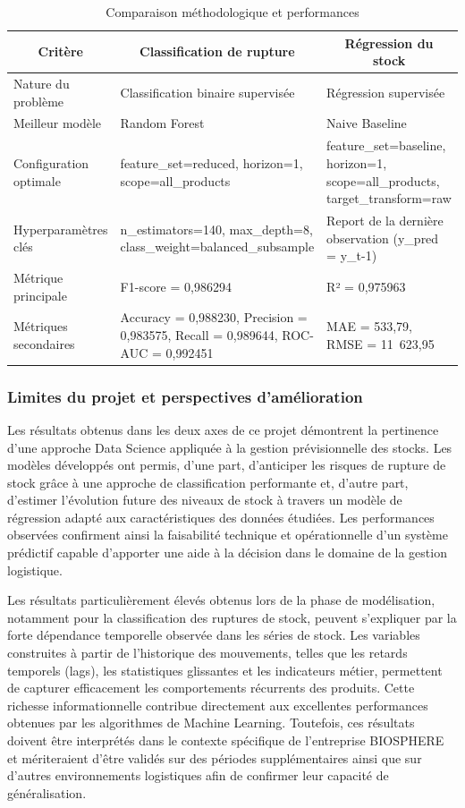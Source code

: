 \begin{table}[H]
\centering
\caption{Comparaison méthodologique et performances}
\label{tab:ch4:comparaison_axes}
\small
\begin{tabular}{|p{3.5cm}|p{5.5cm}|p{5.5cm}|}
\hline
\multicolumn{1}{|c|}{\textbf{Critère}} & \multicolumn{1}{c|}{\textbf{Classification de rupture}} & \multicolumn{1}{c|}{\textbf{Régression du stock}} \\
\hline
Nature du problème & Classification binaire supervisée & Régression supervisée \\
\hline
Meilleur modèle & Random Forest & Naive Baseline \\
\hline
Configuration optimale & feature\_set=reduced, horizon=1, scope=all\_products & feature\_set=baseline, horizon=1, scope=all\_products, target\_transform=raw \\
\hline
Hyperparamètres clés & n\_estimators=140, max\_depth=8, class\_weight=balanced\_subsample & Report de la dernière observation (y\_pred = y\_{t-1}) \\
\hline
Métrique principale & F1-score = 0,986294 & R² = 0,975963 \\
\hline
Métriques secondaires & Accuracy = 0,988230, Precision = 0,983575, Recall = 0,989644, ROC-AUC = 0,992451 & MAE = 533,79, RMSE = 11~623,95 \\
\hline
\end{tabular}
\end{table}
 
\subsubsection{Limites du projet et perspectives d'amélioration}
 
Les résultats obtenus dans les deux axes de ce projet démontrent la pertinence d'une approche Data Science appliquée à la gestion prévisionnelle des stocks. Les modèles développés ont permis, d'une part, d'anticiper les risques de rupture de stock grâce à une approche de classification performante et, d'autre part, d'estimer l'évolution future des niveaux de stock à travers un modèle de régression adapté aux caractéristiques des données étudiées. Les performances observées confirment ainsi la faisabilité technique et opérationnelle d'un système prédictif capable d'apporter une aide à la décision dans le domaine de la gestion logistique.
 
Les résultats particulièrement élevés obtenus lors de la phase de modélisation, notamment pour la classification des ruptures de stock, peuvent s'expliquer par la forte dépendance temporelle observée dans les séries de stock. Les variables construites à partir de l'historique des mouvements, telles que les retards temporels (lags), les statistiques glissantes et les indicateurs métier, permettent de capturer efficacement les comportements récurrents des produits. Cette richesse informationnelle contribue directement aux excellentes performances obtenues par les algorithmes de Machine Learning. Toutefois, ces résultats doivent être interprétés dans le contexte spécifique de l'entreprise BIOSPHERE et mériteraient d'être validés sur des périodes supplémentaires ainsi que sur d'autres environnements logistiques afin de confirmer leur capacité de généralisation.
 

